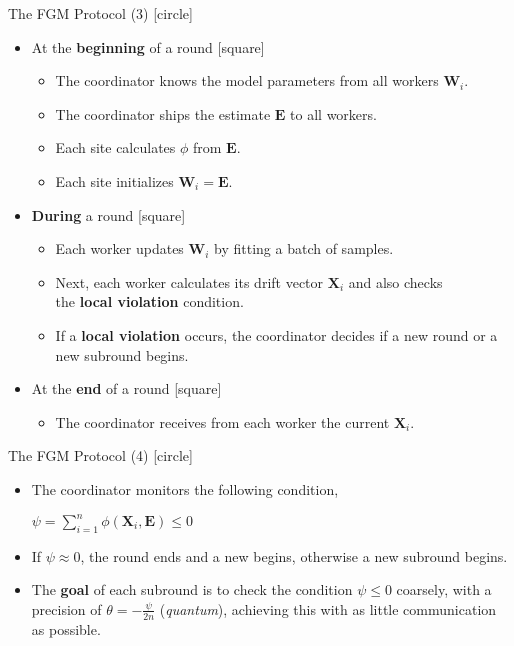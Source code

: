 \begin{frame}{The FGM Protocol (3)}
    [circle]
    \begin{itemize}
        \item{At the \textbf{beginning} of a round
        [square]
        \begin{itemize}
            \item{The coordinator knows the model parameters from all workers $\pmb{W}_i$.}
            \item{The coordinator ships the estimate $\pmb{E}$ to all workers.}
            \item{Each site calculates $\phi$ from $\pmb{E}$.}
            \item{Each site initializes $\pmb{W}_i=\pmb{E}$.}
        \end{itemize}
        }
        \item{\textbf{During} a round
        [square]
        \begin{itemize}
            \item{Each worker updates $\pmb{W}_i$ by fitting a batch of samples.}
            \item{Next, each worker calculates its drift vector $\pmb{X}_i$ and also checks\\the \textbf{local violation} condition.}
            \item{If a \textbf{local violation} occurs, the coordinator decides if a new round or a new subround begins.}
        \end{itemize}
        }
        \item{At the \textbf{end} of a round
        [square]
        \begin{itemize}
            \item{The coordinator receives from each worker the current $\pmb{X}_i$.}
        \end{itemize}
        }
    \end{itemize}
\end{frame}

\begin{frame}{The FGM Protocol (4)}
    [circle]
    \begin{itemize}
        \item{The coordinator monitors the following condition,\\
        \begin{center}
            $\psi = \sum_{i=1}^n\phi(\pmb{X}_i,\pmb{E}) \leq 0$
        \end{center}
        }
        \item{If $\psi\approx0$, the round ends and a new begins, otherwise a new subround begins.}
        \item{The \textbf{goal} of each subround is to check the condition $\psi \leq 0$ coarsely, with a precision of $\theta = -\frac{\psi}{2n}$ (\emph{quantum}), achieving
        this with as little communication as possible.}
    \end{itemize}
\end{frame}